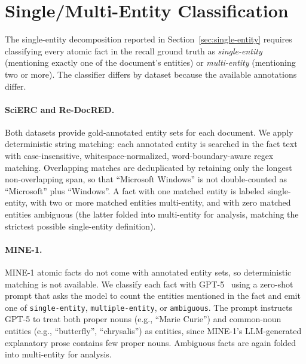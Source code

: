 \documentclass[11pt]{article}
\begin{document}
\section{Single/Multi-Entity Classification}
\label{app:datasets}

The single-entity decomposition reported in Section~\ref{sec:single-entity} requires classifying every atomic fact in the recall ground truth as \emph{single-entity} (mentioning exactly one of the document's entities) or \emph{multi-entity} (mentioning two or more). The classifier differs by dataset because the available annotations differ.

\paragraph{SciERC and Re-DocRED.} Both datasets provide gold-annotated entity sets for each document. We apply deterministic string matching: each annotated entity is searched in the fact text with case-insensitive, whitespace-normalized, word-boundary-aware regex matching. Overlapping matches are deduplicated by retaining only the longest non-overlapping span, so that ``Microsoft Windows'' is not double-counted as ``Microsoft'' plus ``Windows''. A fact with one matched entity is labeled single-entity, with two or more matched entities multi-entity, and with zero matched entities ambiguous (the latter folded into multi-entity for analysis, matching the strictest possible single-entity definition).

\paragraph{MINE-1.} MINE-1 atomic facts do not come with annotated entity sets, so deterministic matching is not available. We classify each fact with GPT-5~\citep{gpt5} using a zero-shot prompt that asks the model to count the entities mentioned in the fact and emit one of \texttt{single-entity}, \texttt{multiple-entity}, or \texttt{ambiguous}. The prompt instructs GPT-5 to treat both proper nouns (e.g., ``Marie Curie'') and common-noun entities (e.g., ``butterfly'', ``chrysalis'') as entities, since MINE-1's LLM-generated explanatory prose contains few proper nouns. Ambiguous facts are again folded into multi-entity for analysis.
\end{document}

